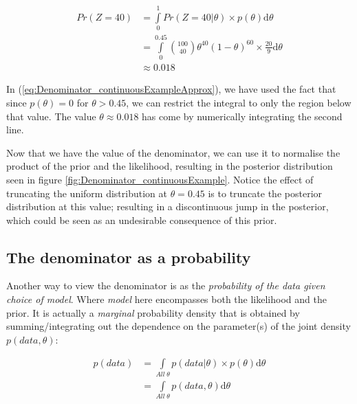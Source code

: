 \documentclass[11pt,fullpage]{book}
\begin{document}
\begin{equation}\label{eq:Denominator_continuousExampleApprox}
\begin{align}
Pr(Z=40) &= \int\limits_{0}^{1} Pr(Z=40|\theta) \times p(\theta) \mathrm{d}\theta\\
&= \int\limits_{0}^{0.45} {100 \choose 40} \theta^{40} (1-\theta)^{60} \times \frac{20}{9} \mathrm{d}\theta\\
&\approx 0.018
\end{align}
\end{equation}

In (\ref{eq:Denominator_continuousExampleApprox}), we have used the fact that since $p(\theta)=0$ for $\theta>0.45$, we can restrict the integral to only the region below that value. The value $\theta\approx 0.018$ has come by numerically integrating the second line.

Now that we have the value of the denominator, we can use it to normalise the product of the prior and the likelihood, resulting in the posterior distribution seen in figure \ref{fig:Denominator_continuousExample}. Notice the effect of truncating the uniform distribution at $\theta=0.45$ is to truncate the posterior distribution at this value; resulting in a discontinuous jump in the posterior, which could be seen as an undesirable consequence of this prior.

\subsection{The denominator as a probability}\label{sec:Denominator_asAProbability}
Another way to view the denominator is as the \textit{probability of the data given choice of model}. Where \textit{model} here encompasses both the likelihood and the prior. It is actually a \textit{marginal} probability density that is obtained by summing/integrating out the dependence on the parameter(s) of the joint density $p(data,\theta)$:

\begin{equation}\label{eq:Denominator_jointDensity}
\begin{align}
p(data) &= \int\limits_{All\; \theta} p(data|\theta) \times p(\theta)\mathrm{d}\theta\\
& = \int\limits_{All\; \theta} p(data,\theta) \mathrm{d}\theta
\end{align}
\end{equation}
\end{document}
